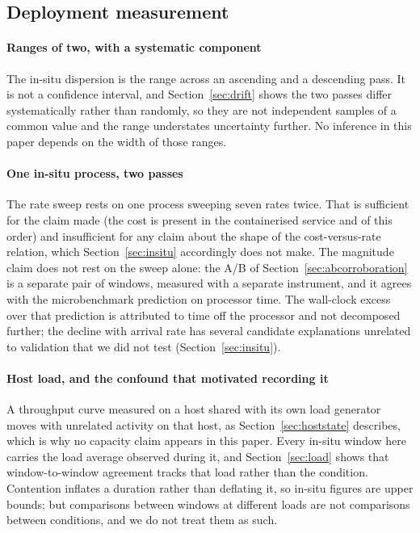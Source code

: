 \documentclass[preprint,12pt,authoryear]{elsarticle}
\begin{document}
\subsection{Deployment measurement}\label{sec:threats-deploy}

\paragraph{Ranges of two, with a systematic component} The in-situ dispersion is
the range across an ascending and a descending pass. It is not a confidence
interval, and Section~\ref{sec:drift} shows the two passes differ systematically
rather than randomly, so they are not independent samples of a common value and
the range understates uncertainty further. No inference in this paper depends on
the width of those ranges.

\paragraph{One in-situ process, two passes} The rate sweep rests on one
process sweeping seven rates twice. That is sufficient for the claim made (the cost is present in the containerised service and of this order) and insufficient for any
claim about the shape of the cost-versus-rate relation, which
Section~\ref{sec:insitu} accordingly does not make. The magnitude claim does not
rest on the sweep alone: the A/B of Section~\ref{sec:abcorroboration} is a
separate pair of windows, measured with a separate instrument, and it agrees
with the microbenchmark prediction on processor time. The wall-clock excess over
that prediction is attributed to time off the processor and not decomposed
further; the decline with arrival rate has several candidate explanations
unrelated to validation that we did not test (Section~\ref{sec:insitu}).

\paragraph{Host load, and the confound that motivated recording it} A
throughput curve measured on a host shared with its own load generator moves with
unrelated activity on that host, as Section~\ref{sec:hoststate} describes, which
is why no capacity claim appears in this paper. Every in-situ window here carries
the load average observed during it, and Section~\ref{sec:load} shows that window-to-window
agreement tracks that load rather than the condition. Contention inflates a
duration rather than deflating it, so in-situ figures are upper bounds; but
comparisons between windows at different loads are not comparisons between
conditions, and we do not treat them as such.
\end{document}
